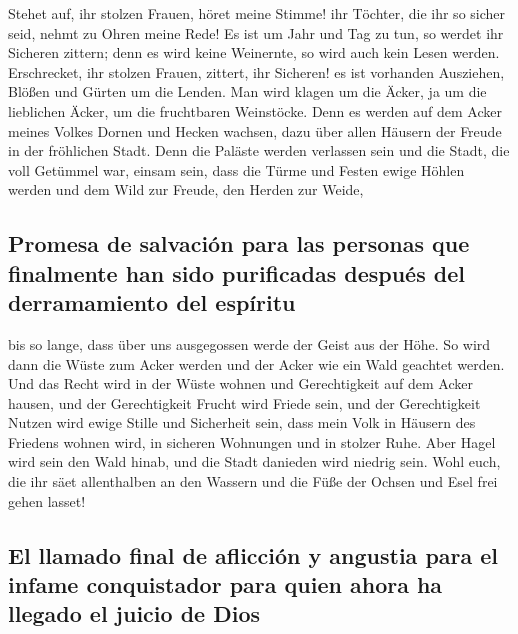  Stehet auf, ihr stolzen Frauen, höret meine Stimme! ihr
Töchter, die ihr so sicher seid, nehmt zu Ohren meine Rede!
 Es ist um Jahr und Tag zu tun, so werdet ihr Sicheren
zittern; denn es wird keine Weinernte, so wird auch kein Lesen werden.
 Erschrecket, ihr stolzen Frauen, zittert, ihr Sicheren!
es ist vorhanden Ausziehen, Blößen und Gürten um die Lenden.
 Man wird klagen um die Äcker, ja um die lieblichen
Äcker, um die fruchtbaren Weinstöcke.  Denn es werden auf
dem Acker meines Volkes Dornen und Hecken wachsen, dazu über allen
Häusern der Freude in der fröhlichen Stadt.  Denn die
Paläste werden verlassen sein und die Stadt, die voll Getümmel war,
einsam sein, dass die Türme und Festen ewige Höhlen werden und dem Wild
zur Freude, den Herden zur Weide,

\hypertarget{promesa-de-salvaciuxf3n-para-las-personas-que-finalmente-han-sido-purificadas-despuuxe9s-del-derramamiento-del-espuxedritu}{%
\subsection{Promesa de salvación para las personas que finalmente han
sido purificadas después del derramamiento del
espíritu}\label{promesa-de-salvaciuxf3n-para-las-personas-que-finalmente-han-sido-purificadas-despuuxe9s-del-derramamiento-del-espuxedritu}}

 bis so lange, dass über uns ausgegossen werde der Geist
aus der Höhe. So wird dann die Wüste zum Acker werden und der Acker wie
ein Wald geachtet werden.  Und das Recht wird in der
Wüste wohnen und Gerechtigkeit auf dem Acker hausen,  und
der Gerechtigkeit Frucht wird Friede sein, und der Gerechtigkeit Nutzen
wird ewige Stille und Sicherheit sein,  dass mein Volk in
Häusern des Friedens wohnen wird, in sicheren Wohnungen und in stolzer
Ruhe.  Aber Hagel wird sein den Wald hinab, und die Stadt
danieden wird niedrig sein.  Wohl euch, die ihr säet
allenthalben an den Wassern und die Füße der Ochsen und Esel frei gehen
lasset!

\hypertarget{el-llamado-final-de-aflicciuxf3n-y-angustia-para-el-infame-conquistador-para-quien-ahora-ha-llegado-el-juicio-de-dios}{%
\subsection{El llamado final de aflicción y angustia para el infame
conquistador para quien ahora ha llegado el juicio de
Dios}\label{el-llamado-final-de-aflicciuxf3n-y-angustia-para-el-infame-conquistador-para-quien-ahora-ha-llegado-el-juicio-de-dios}}

